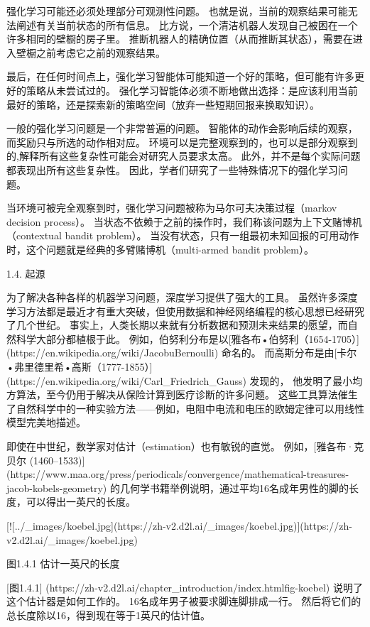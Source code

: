 强化学习可能还必须处理部分可观测性问题。 也就是说，当前的观察结果可能无法阐述有关当前状态的所有信息。 比方说，一个清洁机器人发现自己被困在一个许多相同的壁橱的房子里。 推断机器人的精确位置（从而推断其状态），需要在进入壁橱之前考虑它之前的观察结果。

最后，在任何时间点上，强化学习智能体可能知道一个好的策略，但可能有许多更好的策略从未尝试过的。 强化学习智能体必须不断地做出选择：是应该利用当前最好的策略，还是探索新的策略空间（放弃一些短期回报来换取知识）。

一般的强化学习问题是一个非常普遍的问题。 智能体的动作会影响后续的观察，而奖励只与所选的动作相对应。 环境可以是完整观察到的，也可以是部分观察到的,解释所有这些复杂性可能会对研究人员要求太高。 此外，并不是每个实际问题都表现出所有这些复杂性。 因此，学者们研究了一些特殊情况下的强化学习问题。

当环境可被完全观察到时，强化学习问题被称为马尔可夫决策过程（markov decision process）。 当状态不依赖于之前的操作时，我们称该问题为上下文赌博机（contextual bandit problem）。 当没有状态，只有一组最初未知回报的可用动作时，这个问题就是经典的多臂赌博机（multi-armed bandit problem）。

 1.4. 起源

为了解决各种各样的机器学习问题，深度学习提供了强大的工具。 虽然许多深度学习方法都是最近才有重大突破，但使用数据和神经网络编程的核心思想已经研究了几个世纪。 事实上，人类长期以来就有分析数据和预测未来结果的愿望，而自然科学大部分都植根于此。 例如，伯努利分布是以[雅各布•伯努利（1654-1705）]
(https://en.wikipedia.org/wiki/JacobuBernoulli)
命名的。 而高斯分布是由[卡尔•弗里德里希•高斯（1777-1855）]
(https://en.wikipedia.org/wiki/Carl\_Friedrich\_Gauss)
发现的， 他发明了最小均方算法，至今仍用于解决从保险计算到医疗诊断的许多问题。 这些工具算法催生了自然科学中的一种实验方法——例如，电阻中电流和电压的欧姆定律可以用线性模型完美地描述。

即使在中世纪，数学家对估计（estimation）也有敏锐的直觉。 例如，[雅各布·克贝尔 (1460–1533)]
(https://www.maa.org/press/periodicals/convergence/mathematical-treasures-jacob-kobels-geometry)
的几何学书籍举例说明，通过平均16名成年男性的脚的长度，可以得出一英尺的长度。

[![../\_images/koebel.jpg](https://zh-v2.d2l.ai/\_images/koebel.jpg)](https://zh-v2.d2l.ai/\_images/koebel.jpg)

图1.4.1 估计一英尺的长度

[图1.4.1]
(https://zh-v2.d2l.ai/chapter\_introduction/index.htmlfig-koebel) 
说明了这个估计器是如何工作的。 16名成年男子被要求脚连脚排成一行。 然后将它们的总长度除以16，得到现在等于1英尺的估计值。 

